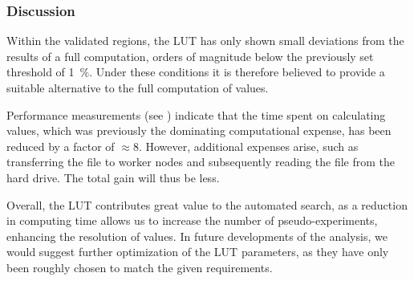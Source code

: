 \subsubsection{Discussion}
Within the validated regions, the \ac{LUT} has only shown small deviations from the results of a full computation, orders of magnitude below the previously set threshold of \SI{1}{\percent}. Under these conditions it is therefore believed to provide a suitable alternative to the full computation of \TS values.

Performance measurements (see ) indicate that the time spent on calculating \TS values, which was previously the dominating computational expense, has been reduced by a factor of $\approx \num{8}$. However, additional expenses arise, such as transferring the file to worker nodes and subsequently reading the file from the hard drive. The total gain will thus be less.

Overall, the \ac{LUT} contributes great value to the automated search, as a reduction in computing time allows us to increase the number of pseudo-experiments, enhancing the resolution of \ptilde values. In future developments of the analysis, we would suggest further optimization of the \ac{LUT} parameters, as they have only been roughly chosen to match the given requirements.

